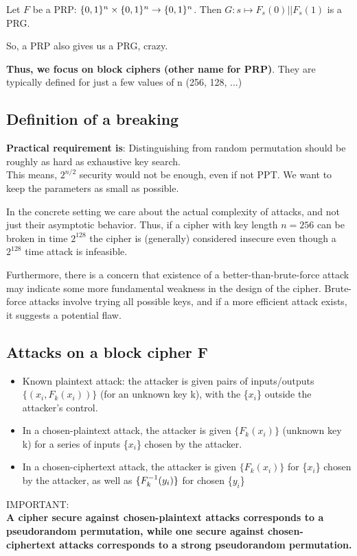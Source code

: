 \documentclass[12pt]{article}
\begin{document}
Let $F$ be a PRP: $\{0, 1\}^n \times \{0, 1\}^n \rightarrow \{0, 1\}^n$. Then $G: s \mapsto F_s(0)||F_s(1)$ is a PRG. 

So, a PRP also gives us a PRG, crazy.

\textbf{Thus, we focus on block ciphers (other name for PRP)}. They are typically defined for just a few values of n (256, 128, ...)

\subsection{Definition of a breaking}
\textbf{Practical requirement is}: Distinguishing from random permutation should be roughly as hard as exhaustive key search.\\
This means, $2^{n/2}$ security would not be enough, even if not PPT. We want to keep the parameters as small as possible.

In the concrete setting we care about the actual complexity of attacks, and not just their asymptotic behavior. Thus, if a cipher with key length $n= 256$ can be broken in time $2^{128}$ the cipher is (generally) considered insecure even though a $2^{128}$ time attack is infeasible.

Furthermore, there is a concern that existence of a better-than-brute-force attack may indicate some more fundamental weakness in the design of the cipher. Brute-force attacks involve trying all possible keys, and if a more efficient attack exists, it suggests a potential flaw.

\subsection{Attacks on a block cipher F}
\begin{itemize}
\item Known plaintext attack: the attacker is given pairs of inputs/outputs $\{(x_i, F_k(x_i))\}$ (for an unknown key k), with the \{$x_i$\} outside the attacker's control.
\item In a chosen-plaintext attack, the attacker is given $\{F_k(x_i)\}$ (unknown key k) for a series of inputs \{$x_i$\} chosen by the attacker.
\item In a chosen-ciphertext attack, the attacker is given $\{F_k(x_i)\}$ for \{$x_i$\} chosen by the attacker, as well as $\{F_k^{-1}(y_i)\}$ for chosen \{$y_i$\}
\end{itemize}

IMPORTANT:\\
\textbf{A cipher secure against chosen-plaintext attacks corresponds to a pseudorandom permutation, while one secure against chosen-ciphertext attacks corresponds to a strong pseudorandom permutation.}
\end{document}
